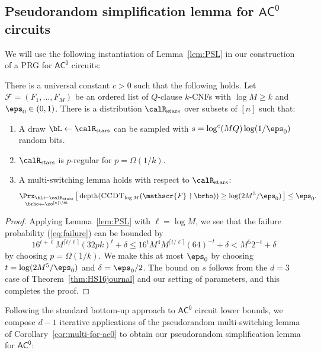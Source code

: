 \documentclass{toc}
\theoremstyle{plain}
\newcommand{\acz}{\mathsf{AC^0}}
\newcommand{\uhr}{\upharpoonright}
\newcommand{\CCDT}{\textsc{CCDT}}
\newcommand{\depth}{\mathrm{depth}}
\newcommand{\stars}{\mathrm{stars}}
\begin{document}
\subsection{Pseudorandom simplification lemma for $\acz$ circuits} 

We will use the following instantiation of Lemma~\ref{lem:PSL} in our construction of a PRG for $\acz$ circuits: 

\begin{corollary}
\label{cor:multi-for-ac0} 
There is a universal constant $c > 0$ such that the following holds. Let $\mathscr{F} = (F_1,\ldots,F_M)$ be an ordered list of $Q$-clause $k$-CNFs with $\log M \geq k$ and $\eps_0 \in (0,1)$. There is a distribution $\calR_\stars$ over subsets of $[n]$ such that: 
\begin{enumerate}
\item A draw $\bL \leftarrow\calR_\stars$ can be sampled with $s = \log^c(MQ)\log(1/\eps_0)$ random bits. 
\item $\calR_\stars$ is $p$-regular for $p = \Omega(1/k)$.
\item A multi-switching lemma holds with respect to $\calR_\stars$: 
\[ \mathop{\Prx_{\bL\leftarrow\calR_\stars}}_{\brho\leftarrow\zo^{[n]\setminus \bL}}\big[\,\depth(\CCDT_{\log M}(\mathscr{F}\uhr\brho)) \ge \log(2M^{5}/\eps_0)\,\big] \le \eps_0. \]
\end{enumerate}  
\end{corollary} 



\begin{proof}
Applying Lemma~\ref{lem:PSL} with $\ell = \log M$, we see that the failure probability (\ref{eq:failure}) can be bounded by 
\[ 
16^{t+\ell}M^{\lceil t/\ell\rceil} (32pk)^t + \delta \le 16^{t}M^4 
M^{\lceil t/\ell\rceil} 
(64)^{-t} + \delta < M^5 2^{-t} + \delta
\]
by choosing $p = \Omega(1/k)$.  We make this at most $\eps_0$ by choosing $t = \log(2M^{5}/\eps_0)$ and $\delta = \eps_0/2$. The bound on $s$ follows from the $d=3$ case of Theorem~\ref{thm:HS16journal} and our setting of parameters, and this completes the proof. 
\end{proof} 

Following the standard bottom-up approach to $\acz$ circuit lower bounds, we compose $d-1$ iterative applications of the pseudorandom multi-switching lemma of Corollary~\ref{cor:multi-for-ac0} to obtain our pseudorandom simplification lemma for $\acz$:
\end{document}
